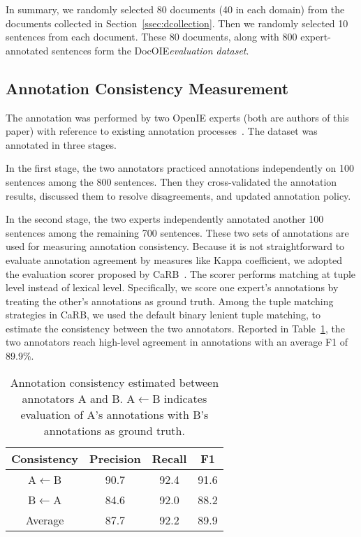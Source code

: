 \documentclass[11pt,a4paper]{article}
\newcommand{\dname}{DocOIE\xspace}
\begin{document}
In summary, we randomly selected 80 documents (40 in each domain) from the documents collected in Section~\ref{ssec:dcollection}. Then we randomly selected 10 sentences from each document. These 80 documents, along with 800 expert-annotated sentences form the \dname \textit{evaluation dataset}.












\subsection{Annotation Consistency Measurement}


The annotation was performed by two OpenIE experts (both are authors of this paper) with reference to existing annotation processes~\cite{stanovsky2016creating,bhardwaj2019carb}. The dataset was annotated in three stages. 

In the first stage, the two annotators practiced annotations independently on 100 sentences among the 800 sentences. Then they cross-validated the annotation results, discussed them to resolve disagreements, and updated annotation policy.

In the second stage, the two experts independently annotated another 100 sentences among the remaining 700 sentences. These two sets of annotations are used for measuring annotation consistency. Because it is not straightforward to evaluate annotation agreement by measures like Kappa coefficient, we adopted the evaluation scorer proposed by CaRB~\cite{bhardwaj2019carb}. The scorer performs matching at tuple level instead of lexical level. Specifically, we score one expert's annotations by treating the other's annotations as ground truth. Among the tuple matching strategies in CaRB, we used the default binary lenient tuple matching, to estimate the consistency between the two annotators. Reported in Table~\ref{tab:IAA}, the two annotators reach high-level agreement in annotations with an average F1 of 89.9\%. 

\begin{table}[t]
\centering
\begin{tabular}{ c|ccc}
 \toprule
 Consistency & Precision & Recall & F1\\
 \midrule
 A$\leftarrow$B & 90.7 &92.4 & 91.6 \\
 B$\leftarrow$A & 84.6 & 92.0 & 88.2\\
 \midrule
 Average & 87.7 & 92.2 & 89.9\\
 \bottomrule
\end{tabular}
\caption{Annotation consistency estimated between annotators A and B. A$\leftarrow$B indicates evaluation of A's annotations with B's annotations as ground truth.}
\label{tab:IAA}
\end{table}
\end{document}

